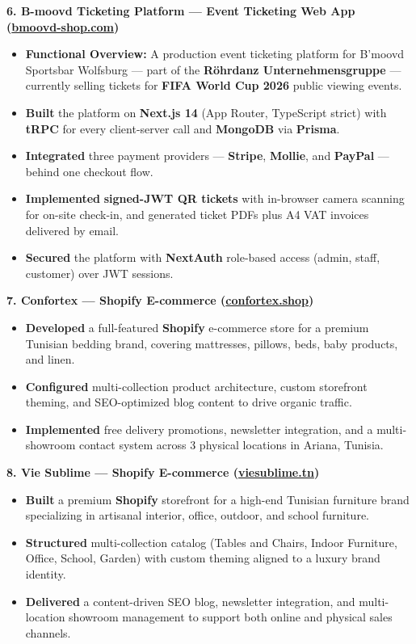 \documentclass[10pt, letterpaper]{article}
\newenvironment{highlights}{
\begin{itemize}[leftmargin=12pt, itemsep=2pt]
}{
\end{itemize}
}
\begin{document}
\textbf{6. B-moovd Ticketing Platform --- Event Ticketing Web App (\href{https://bmoovd-shop.com}{bmoovd-shop.com})}
\begin{highlights}
\item \textbf{Functional Overview:} A production event ticketing platform for B'moovd Sportsbar Wolfsburg --- part of the \textbf{R\"ohrdanz Unternehmensgruppe} --- currently selling tickets for \textbf{FIFA World Cup 2026} public viewing events.
\item \textbf{Built} the platform on \textbf{Next.js 14} (App Router, TypeScript strict) with \textbf{tRPC} for every client-server call and \textbf{MongoDB} via \textbf{Prisma}.
\item \textbf{Integrated} three payment providers --- \textbf{Stripe}, \textbf{Mollie}, and \textbf{PayPal} --- behind one checkout flow.
\item \textbf{Implemented} \textbf{signed-JWT QR tickets} with in-browser camera scanning for on-site check-in, and generated ticket PDFs plus A4 VAT invoices delivered by email.
\item \textbf{Secured} the platform with \textbf{NextAuth} role-based access (admin, staff, customer) over JWT sessions.
\end{highlights}

\textbf{7. Confortex --- Shopify E-commerce (\href{https://confortex.shop}{confortex.shop})}
\begin{highlights}
\item \textbf{Developed} a full-featured \textbf{Shopify} e-commerce store for a premium Tunisian bedding brand, covering mattresses, pillows, beds, baby products, and linen.
\item \textbf{Configured} multi-collection product architecture, custom storefront theming, and SEO-optimized blog content to drive organic traffic.
\item \textbf{Implemented} free delivery promotions, newsletter integration, and a multi-showroom contact system across 3 physical locations in Ariana, Tunisia.
\end{highlights}

\textbf{8. Vie Sublime --- Shopify E-commerce (\href{https://viesublime.tn}{viesublime.tn})}
\begin{highlights}
\item \textbf{Built} a premium \textbf{Shopify} storefront for a high-end Tunisian furniture brand specializing in artisanal interior, office, outdoor, and school furniture.
\item \textbf{Structured} multi-collection catalog (Tables and Chairs, Indoor Furniture, Office, School, Garden) with custom theming aligned to a luxury brand identity.
\item \textbf{Delivered} a content-driven SEO blog, newsletter integration, and multi-location showroom management to support both online and physical sales channels.
\end{highlights}
\end{document}
